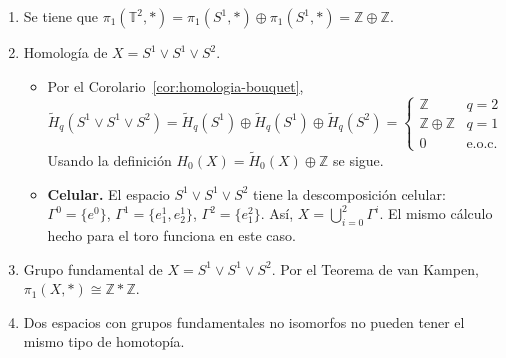 \documentclass[11pt,a4paper]{article}
\theoremstyle{plain}
\theoremstyle{definition}
\theoremstyle{remark}
\newcommand{\ZZ}{\mathbb Z}
\DeclareMathOperator{\im}{im}
\begin{document}
\begin{enumerate}[label=\arabic*.,leftmargin=*]
\begin{enumerate}[label=\alph*)]
\begin{itemize}
Así, $\mathbb T^2=\bigcup_{i=0}^2\Gamma^i$. Por el
Teorema~\ref{thm:cw-celular}, se tiene que $H_q(\mathbb T^2)=0$ para $q>2$.
Por el mismo teorema, se tiene la sucesión exacta:
\[
0\to\ZZ\xrightarrow{d_2}\ZZ\oplus\ZZ\xrightarrow{d_1}\ZZ\to0
\]
Ya que $\#\Gamma^0=1$, entonces, por la Observación~\ref{obs:cw-observaciones}
inciso 3., se tiene que $d_1=0$. Ahora, por medio del
Teorema~\ref{thm:grado-pegado}, calculemos $d_2$.
\[
d_2(e_1^2)=e_1^1+e_2^1-e_1^1-e_2^1=0.
\]
Por lo tanto, $d_1$ y $d_2$ son los mapeos cero. Finalmente,
\[
\begin{aligned}
H_0(\mathbb T^2)&=\mathcal C_0/\im d_1=\ZZ; \\
H_1(\mathbb T^2)&=\ker d_1/\im d_2\cong\mathcal C_1/\im d_2=\ZZ\oplus\ZZ; \\
H_2(\mathbb T^2)&=\ker d_2/\im d_3=\ZZ.
\end{aligned}
\]
En resumen,
\[
H_q(\mathbb T^2)=\begin{cases}\ZZ & q=0,2\\ \ZZ\oplus\ZZ & q=1\\0 & \text{e.o.c.}\end{cases}
\]
\end{itemize}
\item Se tiene que
$\pi_1(\mathbb T^2,*)=\pi_1(S^1,*)\oplus\pi_1(S^1,*)=\ZZ\oplus\ZZ$.
\item Homología de $X=S^1\vee S^1\vee S^2$.
\begin{itemize}
\item Por el Corolario~\ref{cor:homologia-bouquet},
\[
\tilde H_q(S^1\vee S^1\vee S^2)=\tilde H_q(S^1)\oplus\tilde H_q(S^1)\oplus\tilde H_q(S^2)
=\begin{cases}\ZZ & q=2\\ \ZZ\oplus\ZZ & q=1\\0 & \text{e.o.c.}\end{cases}
\]
Usando la definición $H_0(X)=\tilde H_0(X)\oplus\ZZ$ se sigue.
\item \textbf{Celular.} El espacio $S^1\vee S^1\vee S^2$ tiene la
descomposición celular: $\Gamma^0=\{e^0\}$, $\Gamma^1=\{e_1^1,e_2^1\}$,
$\Gamma^2=\{e_1^2\}$. Así, $X=\bigcup_{i=0}^2\Gamma^i$. El mismo cálculo
hecho para el toro funciona en este caso.
\end{itemize}
\item Grupo fundamental de $X=S^1\vee S^1\vee S^2$. Por el Teorema de van
Kampen, $\pi_1(X,*)\cong\ZZ*\ZZ$.
\item Dos espacios con grupos fundamentales no isomorfos no pueden tener el
mismo tipo de homotopía.
\end{enumerate}


\end{enumerate}
\end{document}
